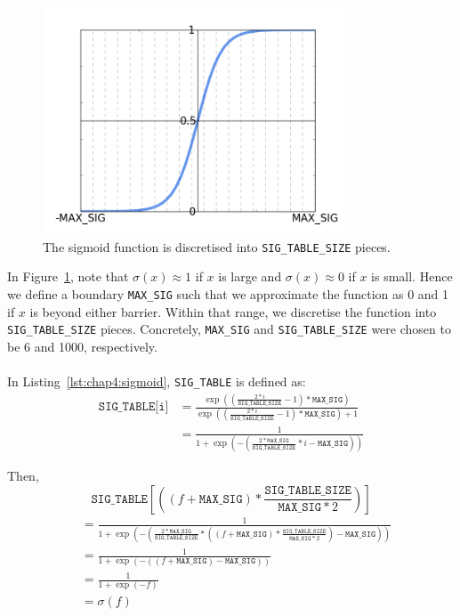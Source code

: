 \documentclass[a4paper,12pt,twoside,openright]{report}
\newcommand{\tx}{\texttt}
\newcommand{\nl}{\\ \\}
\begin{document}
\begin{figure}[htbp]
   \centering
    \includegraphics[width=9cm]{figs/chap4/sigmoid.png}
    \captionsetup{justification=centering}
    \caption[Discretisation of the sigmoid function. ]{The sigmoid function is discretised into \tx{SIG\_TABLE\_SIZE} pieces.}
    \label{fig:chap4:sigmoid}
\end{figure}

In Figure~\ref{fig:chap4:sigmoid}, note that $\sigma(x)\approx 1$ if $x$ is large and $\sigma(x)\approx 0$ if $x$ is small. Hence we define a boundary \tx{MAX\_SIG} such that we approximate the function as 0 and 1 if $x$ is beyond either barrier. Within that range, we discretise the function into \tx{SIG\_TABLE\_SIZE} pieces. Concretely, \tx{MAX\_SIG} and \tx{SIG\_TABLE\_SIZE} were chosen to be 6 and 1000, respectively. 
\nl
In Listing~\ref{lst:chap4:sigmoid}, \tx{SIG\_TABLE} is defined as:
\begin{equation}
\begin{split}
\tx{SIG\_TABLE[i]} &= \frac{ \exp((\frac{2*i}{\tx{SIG\_TABLE\_SIZE}} - 1) * \tx{MAX\_SIG}) }{\exp((\frac{2*i}{\tx{SIG\_TABLE\_SIZE}}  - 1) * \tx{MAX\_SIG}) + 1} \\
				&= \frac{1}{1+\exp(-(\frac{2*\tx{MAX\_SIG}}{\tx{SIG\_TABLE\_SIZE}}*i - \tx{MAX\_SIG}) )}
\end{split}
\end{equation}

Then, 
$$\tx{SIG\_TABLE}[((f + \tx{MAX\_SIG}) * \frac{\tx{SIG\_TABLE\_SIZE}}{\tx{MAX\_SIG}*2})] $$
\begin{equation}
\begin{split}
&= \frac{1}{1+\exp(-(\frac{2*\tx{MAX\_SIG}}{\tx{SIG\_TABLE\_SIZE}}*((f + \tx{MAX\_SIG}) * \frac{\tx{SIG\_TABLE\_SIZE}}{\tx{MAX\_SIG}*2}) - \tx{MAX\_SIG}) )} \\
&= \frac{1}{1+\exp(-((f + \tx{MAX\_SIG}) - \tx{MAX\_SIG}) )} \\
&= \frac{1}{1+\exp(-f)} \\
&= \sigma(f)
\end{split}
\end{equation}
\end{document}
